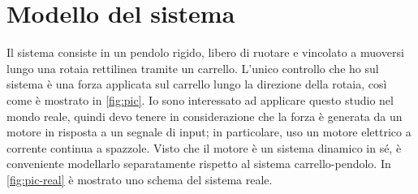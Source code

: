 \section{Modello del sistema}
Il sistema consiste in un pendolo rigido, libero di ruotare e vincolato a muoversi lungo una rotaia rettilinea tramite un carrello.
L'unico controllo che ho sul sistema è
una forza applicata sul carrello lungo la direzione della rotaia,
così come è mostrato in \autoref{fig:pic}.
Io sono interessato
ad applicare questo studio nel mondo reale, quindi devo tenere
in considerazione che la forza è generata da un motore in risposta
a un segnale di input; in particolare, uso un motore elettrico a corrente continua
a spazzole. Visto che il motore è un sistema dinamico in sé,
è conveniente modellarlo separatamente rispetto al sistema
carrello-pendolo.
In \autoref{fig:pic-real} è
mostrato uno schema del sistema reale.

